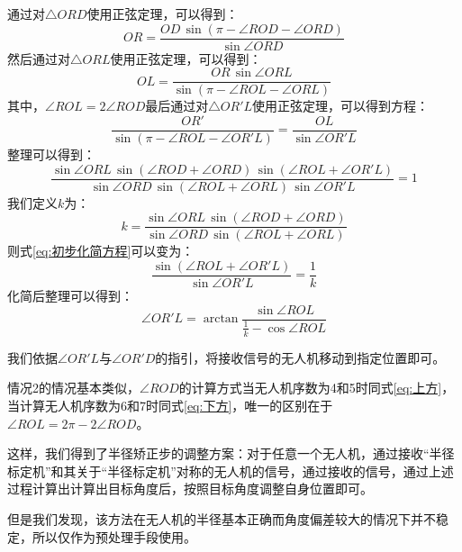 \documentclass[12pt,AutoFakeSlant,AutoFakeBold]{article}
\begin{document}
通过对$\bigtriangleup ORD$使用正弦定理，可以得到：
\begin{equation}
    OR = \frac{OD\,\sin\left(\pi - \angle ROD - \angle ORD\right)}{\sin \angle ORD}
\end{equation}
然后通过对$\bigtriangleup ORL$使用正弦定理，可以得到：
\begin{equation}
    OL = \frac{OR\,\sin{\angle ORL}}{\sin\left(\pi - \angle ROL - \angle ORL\right)}
\end{equation}
其中，$\angle ROL = 2\angle ROD$最后通过对$\bigtriangleup OR'L$使用正弦定理，可以得到方程：
\begin{equation}
    \frac{OR'}{\sin\left(\pi - \angle ROL - \angle OR'L\right)} = \frac{OL}{\sin\angle OR'L}
\end{equation}
整理可以得到：
\begin{equation}
    \frac{\sin\angle ORL\,\sin\left(\angle ROD + \angle ORD\right)\,\sin\left(\angle ROL + \angle OR'L\right)}{\sin\angle ORD\,\sin\left(\angle ROL + \angle ORL\right)\,\sin\angle OR'L} = 1
    \label{eq:初步化简方程}
\end{equation}
我们定义$k$为：
\begin{equation}
    k = \frac{\sin\angle ORL\,\sin\left(\angle ROD + \angle ORD\right)}{\sin\angle ORD\,\sin\left(\angle ROL + \angle ORL\right)}
\end{equation}
则式\ref{eq:初步化简方程}可以变为：
\begin{equation}
    \frac{\sin\left(\angle ROL + \angle OR'L\right)}{\sin\angle OR'L} = \frac{1}{k}
\end{equation}
化简后整理可以得到：
\begin{equation}
    \angle OR'L = \arctan\frac{\sin\angle ROL}{\frac{1}{k}-\cos\angle{ROL}}
\end{equation}

我们依据$\angle OR'L$与$\angle OR'D$的指引，将接收信号的无人机移动到指定位置即可。

情况2的情况基本类似，$\angle ROD$的计算方式当无人机序数为4和5时同式\ref{eq:上方}，当计算无人机序数为6和7时同式\ref{eq:下方}，唯一的区别在于$\angle ROL = 2\pi - 2\angle ROD$。

这样，我们得到了半径矫正步的调整方案：对于任意一个无人机，通过接收“半径标定机”和其关于“半径标定机”对称的无人机的信号，通过接收的信号，通过上述过程计算出计算出目标角度后，按照目标角度调整自身位置即可。

但是我们发现，该方法在无人机的半径基本正确而角度偏差较大的情况下并不稳定，所以仅作为预处理手段使用。
\end{document}
